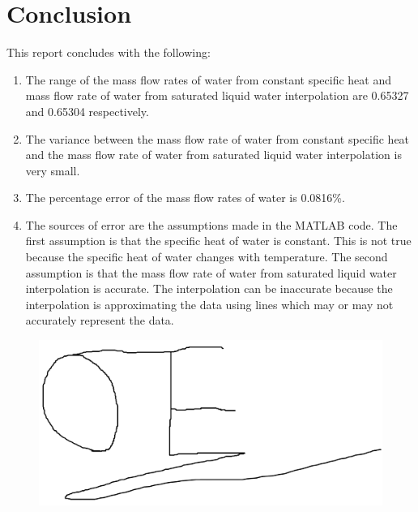 \documentclass[12pt, titlepage]{article}
\begin{document}
\section{Conclusion}
This report concludes with the following:
\begin{enumerate}
  \item The range of the mass flow rates of water from constant specific heat
  and mass flow rate of water from saturated liquid water interpolation are 0.65327
  and 0.65304 respectively.
  \item The variance between the mass flow rate of water from constant specific
  heat and the mass flow rate of water from saturated liquid water interpolation
  is very small.
  \item The percentage error of the mass flow rates of water is 0.0816\%.
  \item The sources of error are the assumptions made in the MATLAB code. The first
  assumption is that the specific heat of water is constant. This is not true
  because the specific heat of water changes with temperature. The second assumption
  is that the mass flow rate of water from saturated liquid water interpolation
  is accurate. The interpolation can be inaccurate because the interpolation is
  approximating the data using lines which may or may not accurately represent the
  data.
\end{enumerate}
\newpage
\begin{figure}[H]
  \centering
  \includegraphics[width=1\textwidth]{./Images/signature.png}
\end{figure}
\end{document}

